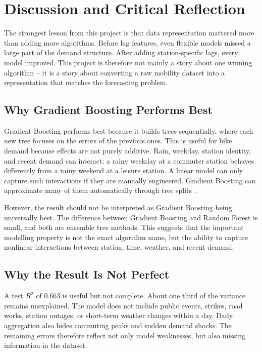 \section{Discussion and Critical Reflection}
\label{sec:discussion}

The strongest lesson from this project is that data representation 
mattered more than adding more algorithms. Before lag features, even 
flexible models missed a large part of the demand structure. After 
adding station-specific lags, every model improved. This project is 
therefore not mainly a story about one winning algorithm -- it is a 
story about converting a raw mobility dataset into a representation 
that matches the forecasting problem.

\subsection{Why Gradient Boosting Performs Best}

Gradient Boosting performs best because it builds trees sequentially, 
where each new tree focuses on the errors of the previous ones. This 
is useful for bike demand because effects are not purely additive. 
Rain, weekday, station identity, and recent demand can interact: a 
rainy weekday at a commuter station behaves differently from a rainy 
weekend at a leisure station. A linear model can only capture such 
interactions if they are manually engineered. Gradient Boosting can 
approximate many of them automatically through tree splits 
\cite{friedman2001}.

However, the result should not be interpreted as Gradient Boosting 
being universally best. The difference between Gradient Boosting and 
Random Forest is small, and both are ensemble tree methods. This 
suggests that the important modelling property is not the exact 
algorithm name, but the ability to capture nonlinear interactions 
between station, time, weather, and recent demand.

\subsection{Why the Result Is Not Perfect}

A test $R^2$ of 0.663 is useful but not complete. About one third of 
the variance remains unexplained. The model does not include public 
events, strikes, road works, station outages, or short-term weather 
changes within a day. Daily aggregation also hides commuting peaks 
and sudden demand shocks. The remaining errors therefore reflect not 
only model weaknesses, but also missing information in the dataset.

